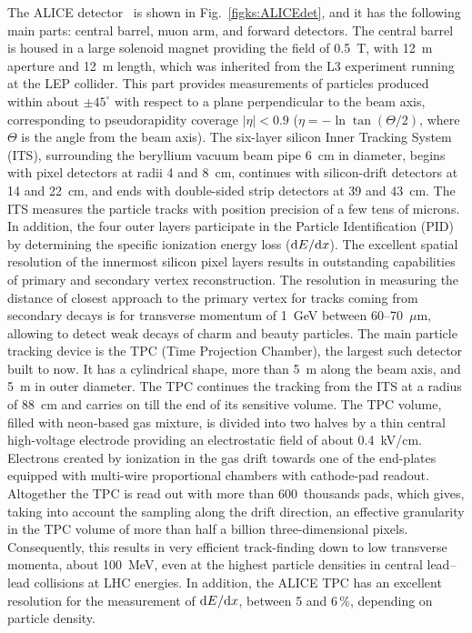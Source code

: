 The ALICE detector~\cite{Aamodt:2008zz} is shown in Fig.~\ref{figks:ALICEdet}, and it has the following main parts: central barrel, muon arm, and forward detectors. The central barrel is housed in a large solenoid magnet providing the field of 0.5~T, with 12~m aperture and 12~m length, which was inherited from the L3 experiment running at the LEP collider. This part provides measurements of particles produced within about $\pm 45^\circ$ with respect to a plane perpendicular to the beam axis, corresponding to pseudorapidity coverage $|\eta| < 0.9$ ($\eta = - \ln \tan (\Theta/2)$, where $\Theta$ is the angle from the beam axis). The six-layer silicon Inner Tracking System (ITS), surrounding the beryllium vacuum beam pipe 6~cm in diameter, begins with pixel detectors at radii 4 and 8~cm, continues with silicon-drift detectors at 14 and 22~cm, and ends with double-sided strip detectors at 39 and 43~cm. The ITS measures the particle tracks with position precision of a few tens of microns. In addition, the four outer layers participate in the Particle Identification (PID) by determining the specific ionization energy loss (${\rm d}E/{\rm d}x$). The excellent spatial resolution of the innermost silicon pixel layers results in outstanding capabilities of primary and secondary vertex reconstruction.  The resolution in measuring the distance of closest approach to the primary vertex for tracks coming from secondary decays is for transverse momentum \pT of 1~GeV between 60--70~$\mu$m, allowing to detect weak decays of charm and beauty particles.
The main particle tracking device is the TPC (Time Projection Chamber), the largest such detector built to now. It has a cylindrical shape, more than 5~m along the beam axis, and 5~m in outer diameter. The TPC continues the tracking from the ITS at a radius of 88~cm and carries on till the end of its sensitive volume. The TPC volume, filled with neon-based gas mixture, is divided into two halves by a thin central high-voltage electrode providing an electrostatic field of about 0.4~kV/cm. Electrons created by ionization in the gas drift towards one of the end-plates equipped with multi-wire proportional chambers with cathode-pad readout. Altogether the TPC is read out with more than 600~thousands pads, which gives, taking into account the sampling along the drift direction, an effective granularity in the TPC volume of more than half a billion three-dimensional pixels. Consequently, this results in very efficient track-finding down to low transverse momenta, about 100~MeV, even at the highest particle densities in central lead--lead collisions at LHC energies. In addition, the ALICE TPC has an excellent resolution for the measurement of ${\rm d}E/{\rm d}x$, between 5 and 6\,\%, depending on particle density. 

